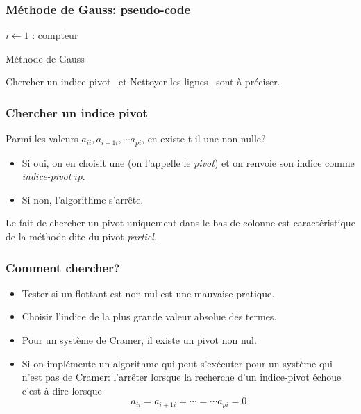 \begin{frame}
  \frametitle{Méthode de Gauss: pseudo-code}
\begin{algorithm}[H]
  $i\leftarrow 1$ : compteur\;
  \caption{Méthode de Gauss}
  \label{resolsystlin_1}
\end{algorithm}
\og Chercher un indice pivot\fg~ et \og Nettoyer les lignes\fg~ sont à préciser.  
\end{frame}

\begin{frame}
  \frametitle{Chercher un indice pivot}
Parmi les valeurs $a_{i i}, a_{i+1 i}, \cdots a_{p i}$, en existe-t-il une non nulle? 
\begin{itemize}
  \item Si oui, on en choisit une (on l'appelle le \emph{pivot}) et on renvoie son indice comme \emph{indice-pivot} $ip$.
  \item Si non, l'algorithme s'arrête.
\end{itemize}
Le fait de chercher un pivot uniquement dans le bas de colonne est caractéristique de la méthode dite du pivot \emph{partiel}.
\end{frame}

\begin{frame}
  \frametitle{Comment chercher?}
\begin{itemize}
  \item Tester si un flottant est non nul est une mauvaise pratique.
  \item Choisir l'indice de la plus grande valeur absolue des termes.
  \item Pour un système de Cramer, il existe un pivot non nul.
  \item Si on implémente un algorithme qui peut s'exécuter pour un système qui n'est pas de Cramer: l'arrêter lorsque la recherche d'un indice-pivot échoue c'est à dire lorsque
\begin{displaymath}
a_{i i} = a_{i+1 i} = \cdots = \cdots a_{p i}=0  
\end{displaymath}
\end{itemize}
\end{frame}

